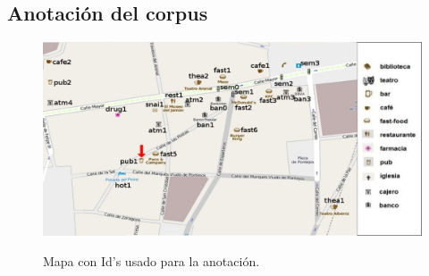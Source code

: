 \subsection{Anotaci\'on del corpus}
\label{corpus-anotacion}

\begin{figure}[H]
\centering
\includegraphics[width=\textwidth]{figures/ids.png}\\[0pt]
\caption{Mapa con Id's usado para la anotaci\'on.}
\label{mapa-con-ids}
\end{figure}

